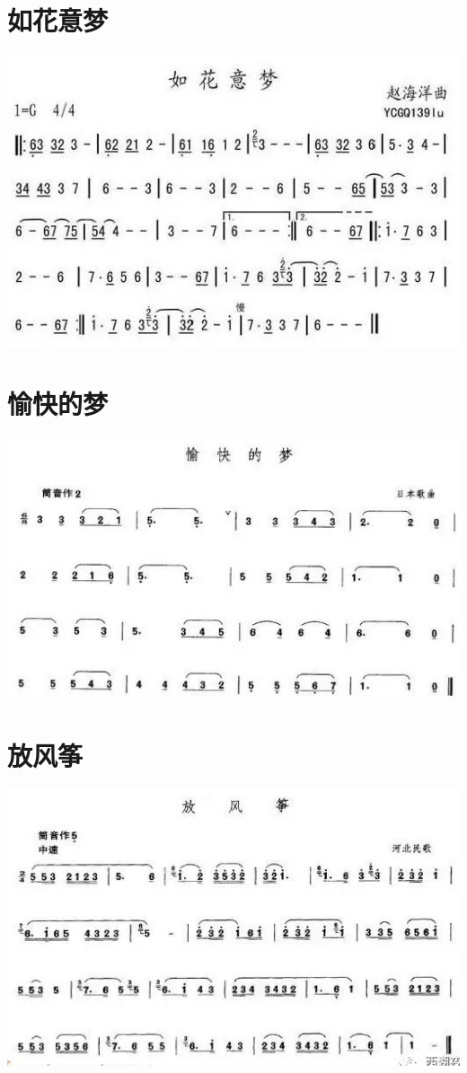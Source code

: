 \documentclass[cn,pad,chinesefont=nofont,twocol]{elegantbook}
\begin{document}
\section{如花意梦}\includegraphics[width=\textwidth]{dongxiao/20200819/如花意梦.jpeg}
\section{愉快的梦}\includegraphics[width=\textwidth]{dongxiao/20200819/愉快的梦.jpeg}

\section{放风筝}\includegraphics[width=\textwidth]{dongxiao/20200819/放风筝.jpeg}
\end{document}
